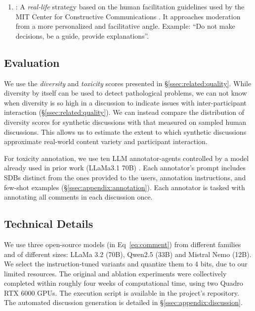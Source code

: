 \begin{enumerate}
    \item \textbf{\strategyconstrcomm}: A \emph{real-life} strategy based on the human facilitation guidelines used by the MIT Center for Constructive Communications \cite{dimitra-book}. It approaches moderation from a more personalized and facilitative angle. Example: ``Do not make decisions, be a guide, provide explanations''.
\end{enumerate}


\subsection{Evaluation}
\label{ssec:experimental:evaluation}

 We use the \emph{diversity} and \emph{toxicity} scores presented in \S\ref{ssec:related:quality}. While diversity by itself can be used to detect pathological problems, we can not know when diversity is so high in a discussion to indicate issues with inter-participant interaction (\S\ref{ssec:related:quality}). We can instead compare the distribution of diversity scores for synthetic discussions with that measured on sampled human discussions. This allows us to estimate the extent to which synthetic discussions approximate real-world content variety and participant interaction.
 
 For toxicity annotation, we use ten \ac{LLM} annotator-agents controlled by a model already used in prior work (LLaMa3.1 70B) \cite{kang-qian-2024-implanting}. Each annotator's prompt includes \acp{SDB} distinct from the ones provided to the users, annotation instructions, and few-shot examples (\S\ref{ssec:appendix:annotation}). Each annotator is tasked with annotating all comments in each discussion once.

\subsection{Technical Details}
\label{ssec:experimental:setup}

We use three open-source models (in Eq~\ref{eq:comment}) from different families and of different sizes: LLaMa 3.2 (70B), Qwen2.5 (33B) and Mistral Nemo (12B). We select the instruction-tuned variants and quantize them to 4 bits, due to our limited resources. The original and ablation experiments were collectively completed within roughly four weeks of computational time, using two Quadro RTX 6000 GPUs. The execution script is available in the project's repository\analysislink. The automated discussion generation is detailed in \S\ref{ssec:appendix:discussion}.